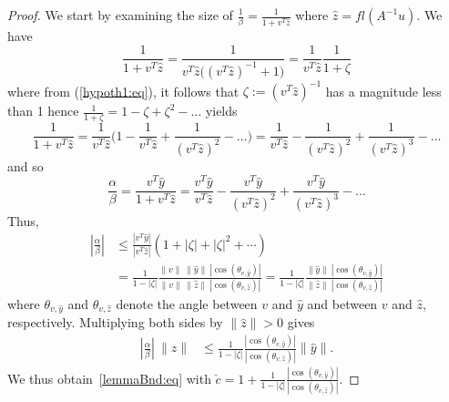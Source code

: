\documentclass{siamltex}
\newcommand{\eqnref}[1]{(\ref{#1})}
\begin{document}
\begin{proof}
We start by examining the size of $\frac{1}{\beta} = \frac{1}{1+v^T \hat z}$ where $\hat z = fl(A^{-1} u)$. We have
\[
\frac{1}{1+v^T \hat z} = \frac{1}{v^T \hat z \big( (v^T \hat z)^{-1} + 1 \big)} = \frac{1}{v^T \hat z} \frac{1}{1 + \zeta}
\]
where from \eqnref{hypoth1:eq}, it follows that $\zeta := (v^T \hat z)^{-1}$ has a magnitude less than 1 hence $\frac{1}{1 + \zeta} = 1 - \zeta + \zeta^2 - \dots$ yields
\[
\frac{1}{1+v^T \hat z} = \frac{1}{v^T \hat z} \big( 1 - \frac{1}{v^T \hat z} + \frac{1}{(v^T \hat z)^2} - \dots \big)
= \frac{1}{v^T \hat z} - \frac{1}{(v^T \hat z)^2} + \frac{1}{(v^T \hat z)^3}  - \dots
\]
and so
\begin{equation}
\label{alpha_beta1:eq}
\frac{\alpha}{\beta} = \frac{v^T \hat y}{1+v^T \hat z} = \frac{v^T \hat y}{v^T \hat z} - \frac{v^T \hat y}{(v^T \hat z)^2} + \frac{v^T \hat y}{(v^T \hat z)^3}  - \dots
\end{equation}
Thus, 
\begin{align}
|\frac{\alpha}{\beta}| & \leq 
\frac{|v^T \hat y|}{|v^T \hat z |}\left(1+|\zeta|+|\zeta|^2+\cdots \right) \nonumber \\
&=\frac{1}{1-|\zeta|}\frac{\|v\|\ \|\hat y\| \ |\cos (\theta_{v,\hat y})| }{\|v\|\ \|\hat z \| \ |\cos (\theta_{v,\hat z})|} = \frac{1}{1-|\zeta|}\frac{\|\hat y\| \ |\cos (\theta_{v,\hat y})| }{\|\hat z \| \ |\cos (\theta_{v,\hat z})|} \label{alphaBetaBound:eq}
\end{align}
where $\theta_{v,\hat y}$ and $\theta_{v,\hat z}$ denote the angle between $v$ and $\hat y$ and between $v$ and $\hat z$, respectively. 
Multiplying both sides by $\|\hat z\| > 0$ gives
\begin{align*}
 |\frac{\alpha}{\beta}| \ \|\hat z\| & \leq
\frac{1}{1-|\zeta|}
 \frac{|\cos (\theta_{v,\hat y})| }{|\cos (\theta_{v,\hat z})|} \|\hat y\|. 
\end{align*}
We thus obtain~\eqref{lemmaBnd:eq} with $\check c=1+\frac{1}{1-|\zeta|}\frac{|\cos (\theta_{v,\hat y})| }{|\cos (\theta_{v,\hat z})|}$.
\end{proof}
\end{document}
